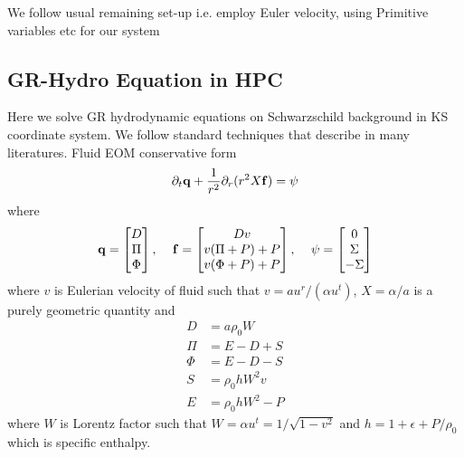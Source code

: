 \documentclass[prd]{revtex4}
\begin{document}
We follow usual remaining set-up i.e. employ Euler velocity, using Primitive variables etc for our system

\subsection{GR-Hydro Equation in HPC}

Here we solve GR hydrodynamic equations on Schwarzschild background in KS coordinate system. We follow standard techniques that describe in many literatures. Fluid EOM conservative form 
\begin{align}
\partial_t {\bf q} +\frac{1}{r^2} \partial_r (r^2 X {\bf f}) = {\bf \psi}
\end{align}
where
\begin{align}
{\bf q} = \begin{bmatrix}
D\\
\Pi\\
\Phi
\end{bmatrix} , \,\,\,\,\,\,\,
{\bf f} = \begin{bmatrix}
Dv\\
v(\Pi+P) + P\\
v(\Phi + P) + P
\end{bmatrix} , \,\,\,\,\,\,\,
{\bf \psi} = \begin{bmatrix}
0\\
\Sigma\\
-\Sigma
\end{bmatrix} 
\end{align}
where $v$ is Eulerian velocity of fluid such that $ v = a u^r / (\alpha u^t)$, $X=\alpha/a$ is a purely geometric quantity and
\begin{align}
D &= a \rho_0 W\\
\Pi &= E-D+S\\
\Phi &=E-D-S\\
S &= \rho_0 h W^2 v \\
E &=\rho_0 h W^2 - P 
\end{align}
where $W$ is Lorentz factor such that $W = \alpha u^t=1/\sqrt{1-v^2}$ and $h=1+\epsilon+P/\rho_0$ which is specific enthalpy. 
\end{document}
